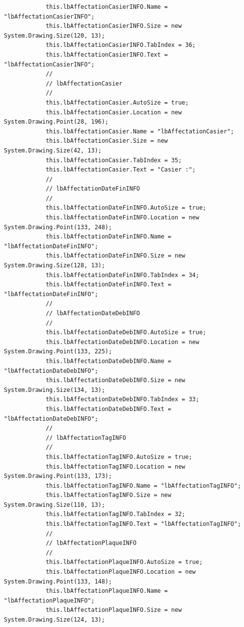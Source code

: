 \documentclass[main.tex]{subfiles}
\begin{document}
\begin{lstlisting}
            this.lbAffectationCasierINFO.Name = "lbAffectationCasierINFO";
            this.lbAffectationCasierINFO.Size = new System.Drawing.Size(120, 13);
            this.lbAffectationCasierINFO.TabIndex = 36;
            this.lbAffectationCasierINFO.Text = "lbAffectationCasierINFO";
            // 
            // lbAffectationCasier
            // 
            this.lbAffectationCasier.AutoSize = true;
            this.lbAffectationCasier.Location = new System.Drawing.Point(28, 196);
            this.lbAffectationCasier.Name = "lbAffectationCasier";
            this.lbAffectationCasier.Size = new System.Drawing.Size(42, 13);
            this.lbAffectationCasier.TabIndex = 35;
            this.lbAffectationCasier.Text = "Casier :";
            // 
            // lbAffectationDateFinINFO
            // 
            this.lbAffectationDateFinINFO.AutoSize = true;
            this.lbAffectationDateFinINFO.Location = new System.Drawing.Point(133, 248);
            this.lbAffectationDateFinINFO.Name = "lbAffectationDateFinINFO";
            this.lbAffectationDateFinINFO.Size = new System.Drawing.Size(128, 13);
            this.lbAffectationDateFinINFO.TabIndex = 34;
            this.lbAffectationDateFinINFO.Text = "lbAffectationDateFinINFO";
            // 
            // lbAffectationDateDebINFO
            // 
            this.lbAffectationDateDebINFO.AutoSize = true;
            this.lbAffectationDateDebINFO.Location = new System.Drawing.Point(133, 225);
            this.lbAffectationDateDebINFO.Name = "lbAffectationDateDebINFO";
            this.lbAffectationDateDebINFO.Size = new System.Drawing.Size(134, 13);
            this.lbAffectationDateDebINFO.TabIndex = 33;
            this.lbAffectationDateDebINFO.Text = "lbAffectationDateDebINFO";
            // 
            // lbAffectationTagINFO
            // 
            this.lbAffectationTagINFO.AutoSize = true;
            this.lbAffectationTagINFO.Location = new System.Drawing.Point(133, 173);
            this.lbAffectationTagINFO.Name = "lbAffectationTagINFO";
            this.lbAffectationTagINFO.Size = new System.Drawing.Size(110, 13);
            this.lbAffectationTagINFO.TabIndex = 32;
            this.lbAffectationTagINFO.Text = "lbAffectationTagINFO";
            // 
            // lbAffectationPlaqueINFO
            // 
            this.lbAffectationPlaqueINFO.AutoSize = true;
            this.lbAffectationPlaqueINFO.Location = new System.Drawing.Point(133, 148);
            this.lbAffectationPlaqueINFO.Name = "lbAffectationPlaqueINFO";
            this.lbAffectationPlaqueINFO.Size = new System.Drawing.Size(124, 13);

\end{lstlisting}
\end{document}
